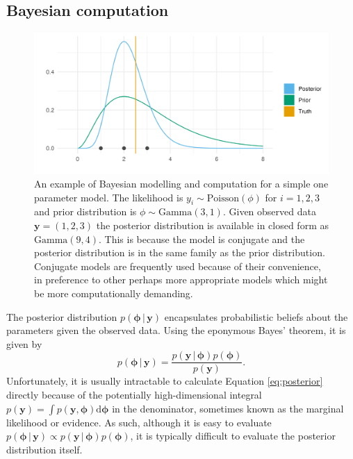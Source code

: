 \documentclass[a4paper, nobind]{templates/ociamthesis}
\newcommand{\y}{\mathbf{y}}
\newcommand{\bphi}{\bm{\phi}}
\begin{document}
\hypertarget{bayesian-computation}{%
\subsection{Bayesian computation}\label{bayesian-computation}}







\begin{figure}

{\centering \includegraphics[width=0.95\linewidth]{figures/bayesian/conjugate} 

}

\caption{An example of Bayesian modelling and computation for a simple one parameter model.
The likelihood is \(y_i \sim \text{Poisson}(\phi)\) for \(i = 1, 2, 3\) and prior distribution is \(\phi \sim \text{Gamma}(3, 1)\).
Given observed data \(\y = (1, 2, 3)\) the posterior distribution is available in closed form as \(\text{Gamma}(9, 4)\).
This is because the model is conjugate and the posterior distribution is in the same family as the prior distribution.
Conjugate models are frequently used because of their convenience, in preference to other perhaps more appropriate models which might be more computationally demanding.}\label{fig:conjugate}
\end{figure}

The posterior distribution \(p(\bphi \, | \, \y)\) encapsulates probabilistic beliefs about the parameters given the observed data.
Using the eponymous Bayes' theorem, it is given by
\begin{equation}
p(\bphi \, | \, \y) = \frac{p(\y \, | \, \bphi) p(\bphi)}{p(\y)}. \label{eq:posterior}
\end{equation}
Unfortunately, it is usually intractable to calculate Equation \eqref{eq:posterior} directly because of the potentially high-dimensional integral \(p(\y) = \int p(\y, \bphi) \text{d}\bphi\) in the denominator, sometimes known as the marginal likelihood or evidence.
As such, although it is easy to evaluate \(p(\bphi \, | \, \y) \propto p(\y \, | \, \bphi) p(\bphi)\), it is typically difficult to evaluate the posterior distribution itself.
\end{document}
